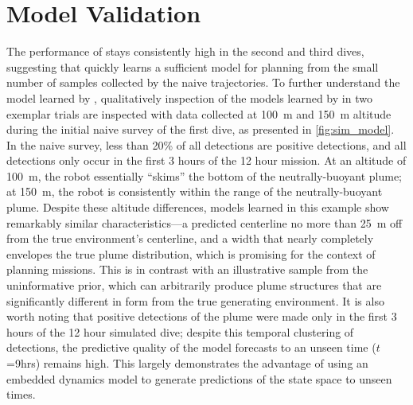 \section{\PHUMES Model Validation}
\label{sec:phumes_perform}
The performance of \PHORTEX stays consistently high in the second and third dives, suggesting that \PHUMES quickly learns a sufficient model for planning from the small number of samples collected by the naive trajectories. To further understand the model learned by \PHUMES, qualitatively inspection of the models learned by \PHUMES in two exemplar trials are inspected with data collected at \SI{100}{\meter} and \SI{150}{\meter} altitude during the initial naive survey of the first dive, as presented in \cref{fig:sim_model}. In the naive survey, less than 20\% of all detections are positive detections, and all detections only occur in the first 3 hours of the 12 hour mission. At an altitude of \SI{100}{\meter}, the robot essentially ``skims'' the bottom of the neutrally-buoyant plume; at \SI{150}{\meter}, the robot is consistently within the range of the neutrally-buoyant plume. Despite these altitude differences, models learned in this example show remarkably similar characteristics---a predicted centerline no more than \SI{25}{\meter} off from the true environment's centerline, and a width that nearly completely envelopes the true plume distribution, which is promising for the context of planning missions. This is in contrast with an illustrative sample from the uninformative prior, which can arbitrarily produce plume structures that are significantly different in form from the true generating environment. It is also worth noting that positive detections of the plume were made only in the first 3 hours of the 12 hour simulated dive; despite this temporal clustering of detections, the predictive quality of the model forecasts to an unseen time ($t$=9hrs) remains high. This largely demonstrates the advantage of using an embedded dynamics model to generate predictions of the state space to unseen times.

